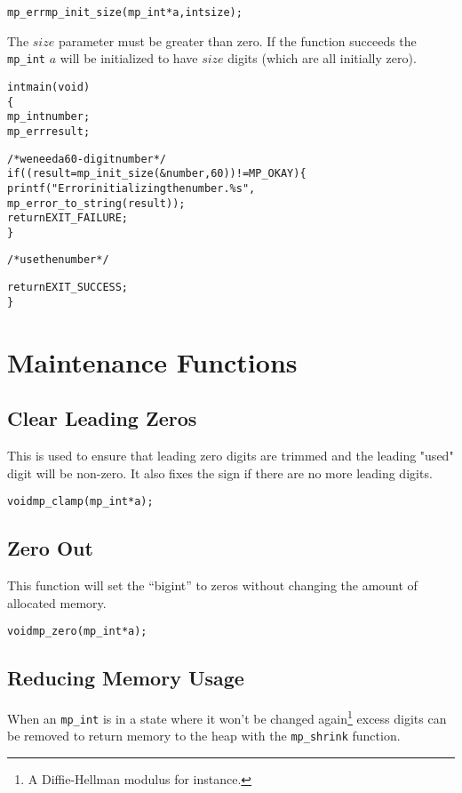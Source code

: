 \documentclass[synpaper]{book}
\begin{document}
\begin{alltt}
mp_err mp_init_size (mp_int *a, int size);
\end{alltt}

The $size$ parameter must be greater than zero.  If the function succeeds the \texttt{mp\_int} $a$ will be initialized
to have $size$ digits (which are all initially zero).

\begin{small}
\begin{alltt}
int main(void)
\{
   mp_int number;
   mp_err result;

   /* we need a 60-digit number */
   if ((result = mp_init_size(&number, 60)) != MP_OKAY) \{
      printf("Error initializing the number.  \%s",
             mp_error_to_string(result));
      return EXIT_FAILURE;
   \}

   /* use the number */

   return EXIT_SUCCESS;
\}
\end{alltt}
\end{small}

\section{Maintenance Functions}
\subsection{Clear Leading Zeros}

This is used to ensure that leading zero digits are trimmed and the leading "used" digit will be non-zero.
It also fixes the sign if there are no more leading digits.

\begin{alltt}
void mp_clamp(mp_int *a);
\end{alltt}

\subsection{Zero Out}

This function will set the ``bigint'' to zeros without changing the amount of allocated memory.

\begin{alltt}
void mp_zero(mp_int *a);
\end{alltt}


\subsection{Reducing Memory Usage}
When an \texttt{mp\_int} is in a state where it won't be changed again\footnote{A Diffie-Hellman modulus for instance.} excess
digits can be removed to return memory to the heap with the \texttt{mp\_shrink} function.
\end{document}
